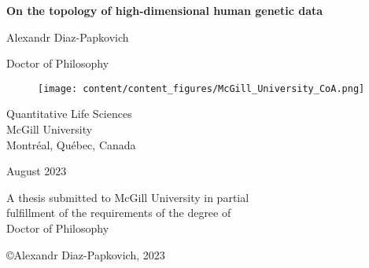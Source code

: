 \begin{titlepage}
\begin{center}







{\sf\bfseries\LARGE  On the topology of high-dimensional human genetic data }






{\large Alexandr Diaz-Papkovich}


Doctor of Philosophy


\begin{figure}[H]
\centering
\texttt{[image: content/content\_figures/McGill\_University\_CoA.png]}
\end{figure}

Quantitative Life Sciences\\
McGill University\\
Montr\'{e}al, Qu\'{e}bec, Canada\\

\vspace{1.5cm}


August 2023




\noindent
A thesis submitted to McGill University in partial\\
fulfillment of the requirements of the degree of\\
Doctor of Philosophy


\vspace{1.4cm}

{\small \copyright Alexandr Diaz-Papkovich, 2023}


\end{center}
\end{titlepage}





